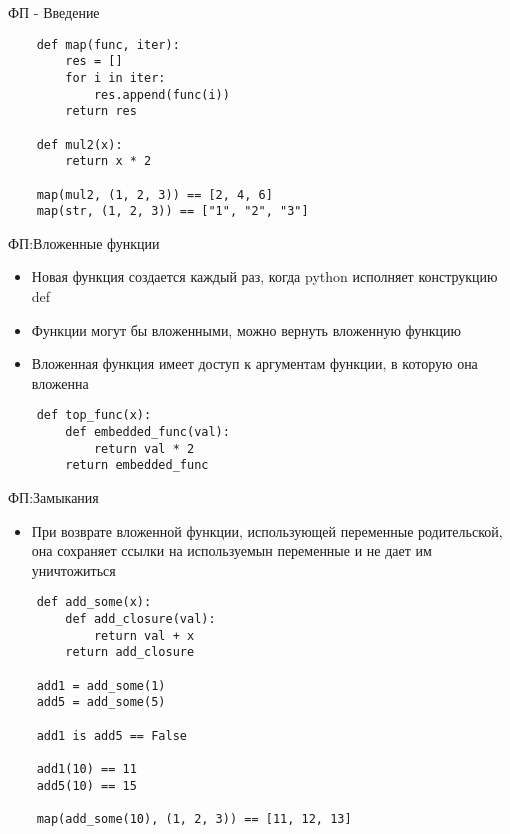 \documentclass{article}
\begin{document}
\begin{center} ФП - Введение \end{center}
\vspace{15pt}
\begin{lstlisting}
    def map(func, iter):
        res = []
        for i in iter:
            res.append(func(i))
        return res

    def mul2(x):
        return x * 2

    map(mul2, (1, 2, 3)) == [2, 4, 6]
    map(str, (1, 2, 3)) == ["1", "2", "3"]
\end{lstlisting}
\newpage

\begin{center} ФП:Вложенные функции \end{center}
\begin{itemize}
    \item Новая функция создается каждый раз, когда python исполняет конструкцию def
    \item Функции могут бы вложенными, можно вернуть вложенную функцию
    \item Вложенная функция имеет доступ к аргументам функции, в которую она вложенна
\end{itemize}
\vspace{15pt}
\begin{lstlisting}
    def top_func(x):
        def embedded_func(val):
            return val * 2
        return embedded_func
\end{lstlisting}
\newpage

\begin{center} ФП:Замыкания \end{center}
\begin{itemize}
    \item При возврате вложенной функции, использующей переменные родительской,
        она сохраняет ссылки на используемын переменные и не дает им уничтожиться
\end{itemize}
\vspace{15pt}
\begin{lstlisting}
    def add_some(x):
        def add_closure(val):
            return val + x
        return add_closure

    add1 = add_some(1)
    add5 = add_some(5)

    add1 is add5 == False

    add1(10) == 11
    add5(10) == 15

    map(add_some(10), (1, 2, 3)) == [11, 12, 13]
\end{lstlisting}
\newpage
\end{document}
